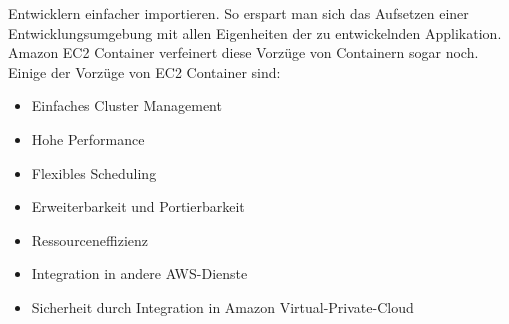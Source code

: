 \documentclass[titlepage]{report}
\begin{document}
Entwicklern einfacher importieren. So erspart man sich das Aufsetzen
einer Entwicklungsumgebung mit allen Eigenheiten der zu entwickelnden
Applikation. Amazon EC2 Container verfeinert diese Vorzüge von
Containern sogar noch. Einige der Vorzüge von EC2 Container
sind:\cite{container}
\begin{itemize}
    \item Einfaches Cluster Management
    \item Hohe Performance
    \item Flexibles Scheduling
    \item Erweiterbarkeit und Portierbarkeit
    \item Ressourceneffizienz
    \item Integration in andere AWS\hyp{}Dienste
    \item Sicherheit durch Integration in Amazon Virtual\hyp{}Private\hyp{}Cloud
\end{itemize}
\end{document}

